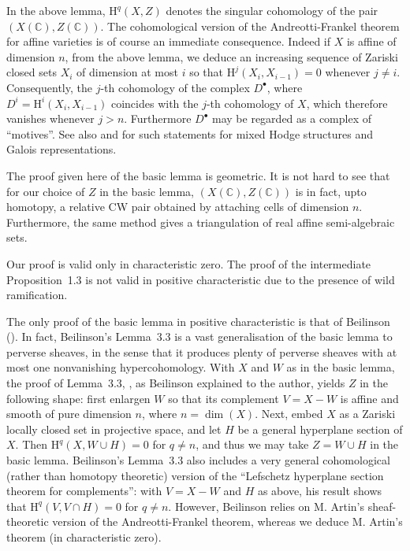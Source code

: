 \documentclass[10pt,twoside]{article}
\newcommand{\homology}{{\mathrm {H}}}
\newcommand{\C}{{\mathbb {C}}}
\begin{document}
\medskip


In the above lemma, $\homology^q(X,Z)$ denotes the singular
cohomology of the pair $(X(\C),Z(\C))$.
The cohomological version of the Andreotti-Frankel theorem for affine varieties 
is of course an immediate consequence. 
Indeed if $X$ is affine of dimension $n$, from the above lemma, we 
deduce an increasing sequence of Zariski closed sets $X_i$ of dimension
at most $i$ so that $\homology^j(X_i, X_{i-1})=0$ whenever 
$j\neq i$.  Consequently, the $j$-th cohomology 
of the complex $D^{\bullet}$, where 
$D^i=\homology ^i(X_i,X_{i-1})$ coincides with the $j$-th cohomology of $X$,
which therefore vanishes whenever $j>n$. Furthermore   $D^{\bullet}$
may be regarded as a complex of ``motives''. See also 
\cite{nori:Be1} and \cite{nori:Be2} for such statements for mixed Hodge structures  
and Galois representations.
  
    The proof given here of the basic lemma is geometric.  
It is not hard to see that for our choice
of $Z$ in the basic lemma, $(X(\C),Z(\C))$ is in fact,
upto homotopy, a relative CW pair obtained by
attaching cells of dimension $n$. Furthermore, the same method
gives a triangulation of real affine semi-algebraic sets. 

Our proof is valid only in characteristic zero. The proof of
the intermediate Proposition~1.3 is not valid in positive
characteristic due to the presence of wild ramification.

The only proof of the basic lemma in positive characteristic
is that of Beilinson (\cite[Lemma~3.3]{nori:Be2}). In fact, Beilinson's  
 Lemma~3.3 is a vast generalisation of the basic lemma
 to perverse sheaves, in the sense that it
produces plenty of perverse sheaves with at most one 
nonvanishing hypercohomology. With $X$ and $W$ as in the basic lemma,  
the proof of Lemma~3.3, \cite{nori:Be2}, as Beilinson explained to the author,
yields $Z$ in the following shape: first enlargen $W$ so
that its complement $V=X-W$ is affine and smooth of pure 
dimension $n$, where $n=\dim (X)$. Next, embed 
$X$ as a Zariski locally closed set in projective space, 
and let $H$ be a general hyperplane section of $X$.
Then $\homology^q(X,W \cup H)=0$ for $q \neq n$, and thus we 
may take $Z=W \cup H$ in the basic lemma. Beilinson's Lemma~3.3 
also includes a very general
cohomological (rather than homotopy theoretic) version
 of the ``Lefschetz hyperplane section theorem for complements'':
 with $V=X-W$ and $H$ as above, his result shows that 
$\homology^q(V,V \cap H)=0$ for $q \neq n$. 
 However, Beilinson relies on M. Artin's
 sheaf-theoretic version of the Andreotti-Frankel theorem,
 whereas we deduce M. Artin's theorem (in characteristic
zero).  
\end{document}
